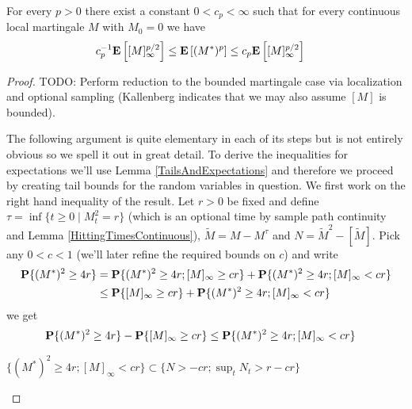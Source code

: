 \begin{thm}\label{BDGInequalities}For every $p > 0$ there exist a constant $0 < c_p < \infty$ such that for every continuous local martingale $M$ with $M_0 = 0$ we have
\begin{align*}
c_p^{-1} \textbf{E}\left[[M]^{p/2}_\infty\right] &\leq \textbf{E}\left[(M^*)^p\right] \leq c_p \textbf{E}\left[[M]^{p/2}_\infty\right]
\end{align*}
\end{thm}
\begin{proof}
TODO: Perform reduction to the bounded martingale case via localization and optional sampling (Kallenberg indicates that we may also assume $[M]$ is bounded).

The following argument is quite elementary in each of its steps but is not entirely obvious so we spell it out in great detail.  To derive the inequalities for expectations we'll use Lemma \ref{TailsAndExpectations} and therefore we proceed by creating tail bounds for the random variables in question.  We first work on the right hand inequality of the result.  Let $r > 0$ be fixed and define $\tau = \inf \lbrace t \geq 0 \mid M_t^2 = r \rbrace$ (which is an optional time by sample path continuity and Lemma \ref{HittingTimesContinuous}), $\tilde{M} = M - M^\tau$ and $N = \tilde{M}^2 - [\tilde{M}]$.  Pick any $0 < c < 1$ (we'll later refine the required bounds on $c$) and write
\begin{align*}
\textbf{P}\{(M^*)^2 \geq 4r\} &= \textbf{P}\{(M^*)^2 \geq 4r ; [M]_\infty \geq cr\} + \textbf{P}\{(M^*)^2 \geq 4r; [M]_\infty < cr\} \\
&\leq \textbf{P}\{[M]_\infty \geq cr\} + \textbf{P}\{(M^*)^2 \geq 4r; [M]_\infty < cr\} 
\end{align*}
we get
\begin{align*}
\textbf{P}\{(M^*)^2 \geq 4r\} - \textbf{P}\{[M]_\infty \geq cr\} &\leq \textbf{P}\{(M^*)^2 \geq 4r; [M]_\infty < cr\} 
\end{align*}

\begin{clm}\label{BDGClaim1} $\lbrace (M^*)^2 \geq 4r; [M]_\infty < cr \rbrace \subset \lbrace N > -cr; \sup_t N_t > r - cr \rbrace$
\end{clm}


\end{proof}
